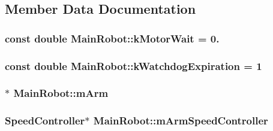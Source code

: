 \subsection{\-Member \-Data \-Documentation}
\hypertarget{class_main_robot_a4e6229fb0a09d81783c6ac16258329b2}{
\subsubsection[{k\-Motor\-Wait}]{\setlength{\rightskip}{0pt plus 5cm}const double {\bf \-Main\-Robot\-::k\-Motor\-Wait} = 0.}}\label{class_main_robot_a4e6229fb0a09d81783c6ac16258329b2}
\hypertarget{class_main_robot_a51bf97ba67ef557e633ae4456ddbb257}{
\subsubsection[{k\-Watchdog\-Expiration}]{\setlength{\rightskip}{0pt plus 5cm}const double {\bf \-Main\-Robot\-::k\-Watchdog\-Expiration} = 1}}\label{class_main_robot_a51bf97ba67ef557e633ae4456ddbb257}
\hypertarget{class_main_robot_ab546e398e21420c01448ab3e69e97d8f}{
\subsubsection[{m\-Arm}]{$\ast$ {\bf \-Main\-Robot\-::m\-Arm}}}\label{class_main_robot_ab546e398e21420c01448ab3e69e97d8f}
\hypertarget{class_main_robot_ae7b1431cf829a6e482e88cc96eb212fc}{
\subsubsection[{m\-Arm\-Speed\-Controller}]{\setlength{\rightskip}{0pt plus 5cm}\-Speed\-Controller$\ast$ {\bf \-Main\-Robot\-::m\-Arm\-Speed\-Controller}}}\label{class_main_robot_ae7b1431cf829a6e482e88cc96eb212fc}
